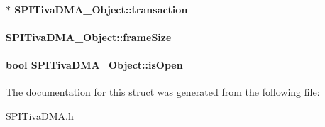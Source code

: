 \paragraph[{transaction}]{$\ast$ S\+P\+I\+Tiva\+D\+M\+A\+\_\+\+Object\+::transaction}\label{struct_s_p_i_tiva_d_m_a___object_a6cdc7c21c1b929e2a2f3956072bd444f}
\paragraph[{frame\+Size}]{ S\+P\+I\+Tiva\+D\+M\+A\+\_\+\+Object\+::frame\+Size}\label{struct_s_p_i_tiva_d_m_a___object_a3f59d2d7fe94828380dda940e0ccdcdd}
\paragraph[{is\+Open}]{\setlength{\rightskip}{0pt plus 5cm}bool S\+P\+I\+Tiva\+D\+M\+A\+\_\+\+Object\+::is\+Open}\label{struct_s_p_i_tiva_d_m_a___object_a6df49861408f17545708084630dfca22}


The documentation for this struct was generated from the following file\+:\begin{DoxyCompactItemize}
\item 
\hyperlink{_s_p_i_tiva_d_m_a_8h}{S\+P\+I\+Tiva\+D\+M\+A.\+h}\end{DoxyCompactItemize}
